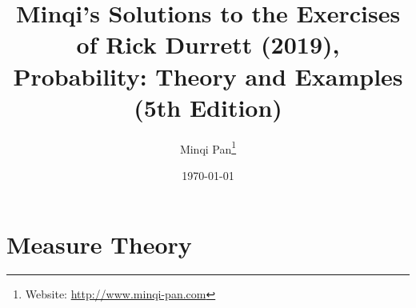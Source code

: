 \documentclass{amsbook}
\theoremstyle{definition}
\theoremstyle{remark}
\numberwithin{section}{chapter}
\numberwithin{equation}{chapter}
\begin{document}
\frontmatter

\title{Minqi's Solutions to the Exercises of Rick Durrett (2019), Probability: Theory and Examples (5th Edition)}

\author{Minqi Pan\footnote{Website: \href{http://www.minqi-pan.com}{http://www.minqi-pan.com}}}

\date{\today}

\maketitle

\setcounter{page}{4}

\tableofcontents

\mainmatter

\chapter{Measure Theory}
\end{document}
